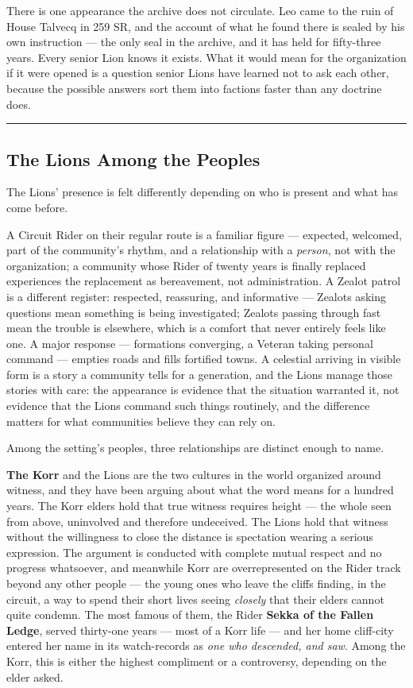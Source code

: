 There is one appearance the archive does not circulate. Leo came to the ruin of House Talvecq in 259 SR, and the account of what he found there is sealed by his own instruction --- the only seal in the archive, and it has held for fifty-three years. Every senior Lion knows it exists. What it would mean for the organization if it were opened is a question senior Lions have learned not to ask each other, because the possible answers sort them into factions faster than any doctrine does.

\medskip\hrule\medskip

\subsection{The Lions Among the Peoples}

The Lions' presence is felt differently depending on who is present and what has come before.

A Circuit Rider on their regular route is a familiar figure --- expected, welcomed, part of the community's rhythm, and a relationship with a \textit{person}, not with the organization; a community whose Rider of twenty years is finally replaced experiences the replacement as bereavement, not administration. A Zealot patrol is a different register: respected, reassuring, and informative --- Zealots asking questions mean something is being investigated; Zealots passing through fast mean the trouble is elsewhere, which is a comfort that never entirely feels like one. A major response --- formations converging, a Veteran taking personal command --- empties roads and fills fortified towns. A celestial arriving in visible form is a story a community tells for a generation, and the Lions manage those stories with care: the appearance is evidence that the situation warranted it, not evidence that the Lions command such things routinely, and the difference matters for what communities believe they can rely on.

Among the setting's peoples, three relationships are distinct enough to name.

\textbf{The Korr} and the Lions are the two cultures in the world organized around witness, and they have been arguing about what the word means for a hundred years. The Korr elders hold that true witness requires height --- the whole seen from above, uninvolved and therefore undeceived. The Lions hold that witness without the willingness to close the distance is spectation wearing a serious expression. The argument is conducted with complete mutual respect and no progress whatsoever, and meanwhile Korr are overrepresented on the Rider track beyond any other people --- the young ones who leave the cliffs finding, in the circuit, a way to spend their short lives seeing \textit{closely} that their elders cannot quite condemn. The most famous of them, the Rider \textbf{Sekka of the Fallen Ledge}, served thirty-one years --- most of a Korr life --- and her home cliff-city entered her name in its watch-records as \textit{one who descended, and saw}. Among the Korr, this is either the highest compliment or a controversy, depending on the elder asked.

